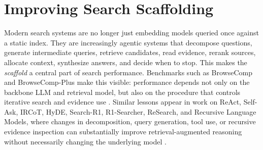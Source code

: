 


\section{Improving Search Scaffolding}

 Modern search systems are no longer just embedding models queried once against a static index. They are increasingly agentic systems that decompose questions, generate intermediate queries, retrieve candidates, read evidence, rerank sources, allocate context, synthesize answers, and decide when to stop. This makes the \emph{scaffold} a central part of search performance. Benchmarks such as BrowseComp and BrowseComp-Plus make this visible: performance depends not only on the backbone LLM and retrieval model, but also on the procedure that controls iterative search and evidence use . Similar lessons appear in work on ReAct, Self-Ask, IRCoT, HyDE, Search-R1, R1-Searcher, ReSearch, and Recursive Language Models, where changes in decomposition, query generation, tool use, or recursive evidence inspection can substantially improve retrieval-augmented reasoning without necessarily changing the underlying model .

